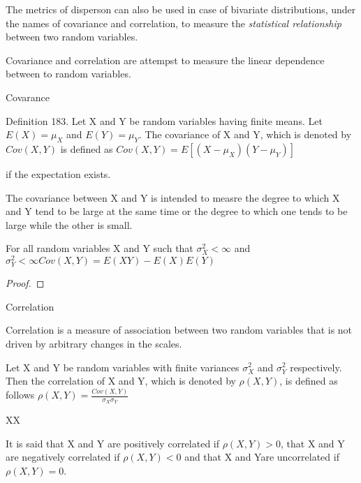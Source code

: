 The metrics of disperson can also be used in case of bivariate distributions, under the names of covariance and correlation, to measure the \emph{statistical relationship} between two random variables.

Covariance and correlation are attempst to measure the linear dependence between to random variables.

Covarance

\begin{definition}
Definition 183. Let X and Y be random variables having finite means. Let $E\left(X\right)=\mu_{X}$ and $E\left(Y\right)=\mu_{Y}$. The covariance of X and Y, which is denoted by $Cov\left(X,Y\right)$ is defined as $Cov\left(X,Y\right)=E\left[\left(X-\mu_{X}\right)\left(Y-\mu_{Y}\right)\right]$
\end{definition}

if the expectation exists.

The covariance between X and Y is intended to measre the degree to which X and Y tend to be large at the same time or the degree to which one tends to be large while the other is small.

\begin{proposition}
For all random variables X and Y such that $\sigma_{X}^{2}<\infty$ and $\sigma_{Y}^{2}<\infty Cov\left(X,Y\right)=E\left(XY\right)-E\left(X\right)E\left(Y\right)$
\end{proposition}
\begin{proof}
\end{proof}

Correlation

Correlation is a measure of association between two random variables that is not driven by arbitrary changes in the scales.

\begin{definition}
Let X and Y be random variables with finite variances $\sigma_{X}^{2}$ and $\sigma_{Y}^{2}$ respectively. Then the correlation of X and Y, which is denoted by $\rho\left(X,Y\right)$, is defined as follows $\rho\left(X,Y\right)=\frac{Cov\left(X,Y\right)}{\sigma_{X}\sigma_{Y}}$
\end{definition}

XX

\begin{definition}
It is said that X and Y are positively correlated if $\rho\left(X,Y\right)>0$, that X and Y are negatively correlated if $\rho\left(X,Y\right)<0$ and that X and Yare uncorrelated if $\rho\left(X,Y\right)=0$.
\end{definition}

